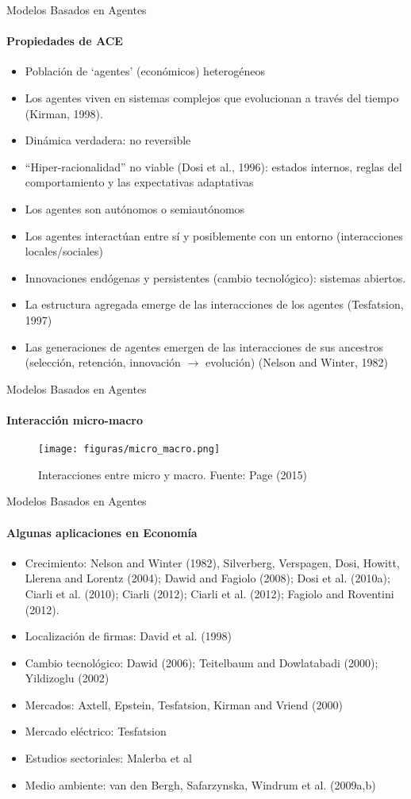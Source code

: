 \documentclass[11pt]{beamer}
\begin{document}
\begin{frame}
\begin{frame}{Modelos Basados en Agentes}
\framesubtitle{Propiedades de ACE}
\begin{itemize}
\small      \item Población de ‘agentes’ (económicos) heterogéneos
\item Los agentes viven en sistemas complejos que evolucionan a través del tiempo (Kirman, 1998).
\item Dinámica verdadera: no reversible
\item “Hiper-racionalidad” no viable (Dosi et al., 1996): estados internos, reglas
del comportamiento y las expectativas adaptativas
\item Los agentes son autónomos o semiautónomos
\item Los agentes interactúan entre sí y posiblemente con un entorno (interacciones locales/sociales)
\item Innovaciones endógenas y persistentes (cambio tecnológico): sistemas abiertos.
\item La estructura agregada emerge de las interacciones de los agentes (Tesfatsion, 1997)
\item Las generaciones de agentes emergen de las interacciones de sus ancestros (selección, retención, innovación $\rightarrow$ evolución) (Nelson and Winter, 1982)
  \end{itemize}  
\end{frame}

\begin{frame}{Modelos Basados en Agentes}
\framesubtitle{Interacción micro-macro}
\begin{figure}
    \centering
    \texttt{[image: figuras/micro\_macro.png]}
    \caption{Interacciones entre micro y macro. Fuente: Page (2015)}
    \label{fig:my_label}
\end{figure} 
\end{frame}

\begin{frame}{Modelos Basados en Agentes}
    \framesubtitle{Algunas aplicaciones en Economía}
    \begin{itemize}
\item Crecimiento: Nelson and Winter (1982), Silverberg, Verspagen, Dosi, Howitt, Llerena and Lorentz (2004); Dawid and Fagiolo (2008); Dosi et al. (2010a); Ciarli et al. (2010); Ciarli (2012); Ciarli et al. (2012); Fagiolo and Roventini (2012).
\item Localización de firmas: David et al. (1998)
\item Cambio tecnológico: Dawid (2006); Teitelbaum and Dowlatabadi (2000); Yildizoglu (2002)
\item Mercados: Axtell, Epstein, Tesfatsion, Kirman and Vriend (2000)
\item Mercado eléctrico: Tesfatsion
\item Estudios sectoriales: Malerba et al
\item Medio ambiente: van den Bergh, Safarzynska, Windrum et al. (2009a,b)
    \end{itemize}
\end{frame}


\end{frame}
\end{document}
